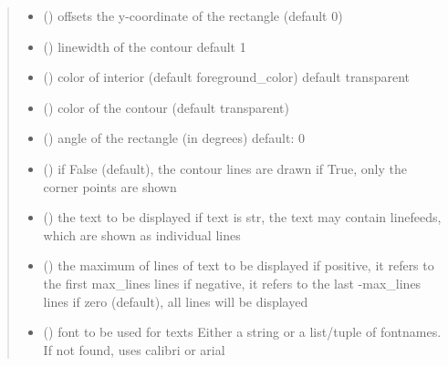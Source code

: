 \documentclass[letterpaper,10pt,english]{sphinxmanual}
\begin{document}
\begin{fulllineitems}
\begin{quote}
\begin{description}
\begin{itemize}
\item {} 
 () \textendash{} offsets the y-coordinate of the rectangle (default 0)

\item {} 
 () \textendash{} linewidth of the contour 
default 1

\item {} 
 () \textendash{} color of interior (default foreground\_color) 
default transparent

\item {} 
 () \textendash{} color of the contour (default transparent)

\item {} 
 () \textendash{} angle of the rectangle (in degrees) 
default: 0

\item {} 
 () \textendash{} if False (default), the contour lines are drawn 
if True, only the corner points are shown

\item {} 
 (\sphinxstyleliteralemphasis{\sphinxupquote{, }}) \textendash{} the text to be displayed 
if text is str, the text may contain linefeeds, which are shown as individual lines

\item {} 
 () \textendash{} the maximum of lines of text to be displayed 
if positive, it refers to the first max\_lines lines 
if negative, it refers to the last -max\_lines lines 
if zero (default), all lines will be displayed

\item {} 
 () \textendash{} font to be used for texts 
Either a string or a list/tuple of fontnames.
If not found, uses calibri or arial


\end{itemize}
\end{description}
\end{quote}
\end{fulllineitems}
\end{document}
